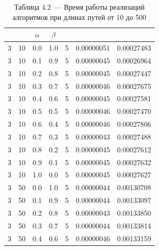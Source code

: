 \documentclass[12pt, a4paper]{report}
\begin{document}
	\begin{table} [H]
		\caption*{Таблица 4.2~--- Время работы реализаций алгоритмов при длинах путей от 10 до 500}
		\begin{tabular}[l]{|c c c c c c c|}
			\hline
			\text{Размер} & \text{Длина жизни} & $\alpha$ & $\beta$ & \text{Точность} & \text{Время полн. перебора} & \text{Время мурав.} \\\hline
			
			3 & 10 & 0.0 & 1.0 & 5 & 0.00000051 & 0.00027483 \\
			
			3 & 10 & 0.1 & 0.9 & 5 & 0.00000045 & 0.00026964 \\
			
			3 & 10 & 0.2 & 0.8 & 5 & 0.00000045 & 0.00027447 \\
			
			3 & 10 & 0.3 & 0.7 & 5 & 0.00000046 & 0.00027675 \\
			
			3 & 10 & 0.4 & 0.6 & 5 & 0.00000045 & 0.00027581 \\
			
			3 & 10 & 0.5 & 0.5 & 5 & 0.00000046 & 0.00027470 \\
			
			3 & 10 & 0.6 & 0.4 & 5 & 0.00000046 & 0.00027806 \\
			
			3 & 10 & 0.7 & 0.3 & 5 & 0.00000043 & 0.00027488 \\
			
			3 & 10 & 0.8 & 0.2 & 5 & 0.00000045 & 0.00027612 \\
			
			3 & 10 & 0.9 & 0.1 & 5 & 0.00000045 & 0.00027632 \\
			
			3 & 10 & 1.0 & 0.0 & 5 & 0.00000045 & 0.00027627 \\
			
			3 & 50 & 0.0 & 1.0 & 5 & 0.00000044 & 0.00130708 \\
			
			3 & 50 & 0.1 & 0.9 & 5 & 0.00000044 & 0.00133097 \\
			
			3 & 50 & 0.2 & 0.8 & 5 & 0.00000043 & 0.00133850 \\
			
			3 & 50 & 0.3 & 0.7 & 5 & 0.00000044 & 0.00133814 \\
			
			3 & 50 & 0.4 & 0.6 & 5 & 0.00000046 & 0.00133159 \\
			

\end{tabular}
\end{table}
\end{document}
